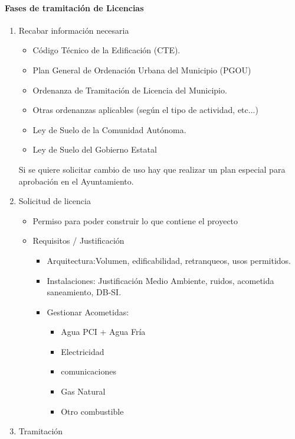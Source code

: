\paragraph{Fases de tramitación de Licencias}
\begin{enumerate}
    \item Recabar información necesaria
    \begin{itemize}
        \item Código Técnico de la Edificación (CTE). 
        \item Plan General de Ordenación Urbana del Municipio (PGOU)
        \item Ordenanza de Tramitación de Licencia del Municipio.
        \item Otras ordenanzas aplicables (según el tipo de actividad, etc...)
        \item Ley de Suelo de la Comunidad Autónoma.
        \item Ley de Suelo del Gobierno Estatal
    \end{itemize}
    Si se quiere solicitar cambio de uso hay que realizar un plan especial para aprobación en el Ayuntamiento.
    \item Solicitud de licencia
    \begin{itemize}
        \item Permiso para poder construir lo que contiene el proyecto
        \item Requisitos / Justificación
        \begin{itemize}
            \item Arquitectura:Volumen, edificabilidad, retranqueos, usos permitidos.
            \item Instalaciones: Justificación Medio Ambiente, ruidos, acometida saneamiento, DB-SI.
            \item Gestionar Acometidas: 
            \begin{itemize}
                \item Agua PCI + Agua Fría
                \item Electricidad
                \item comunicaciones
                \item Gas Natural
                \item Otro combustible
            \end{itemize}
        \end{itemize}
    \end{itemize}
    \item Tramitación

\end{enumerate}
